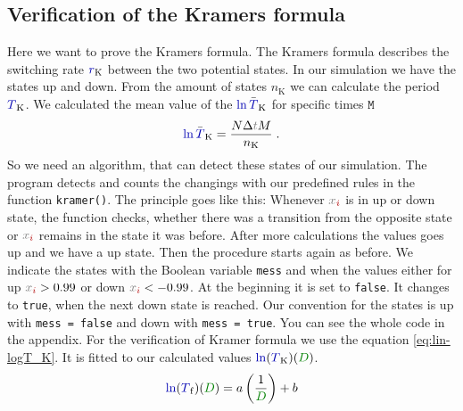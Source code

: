 \documentclass[10pt,fleqn,%
reqno,a4paper]{article}
\makeatletter
\def\mathcolor#1#{\@mathcolor{#1}}
\def\@mathcolor#1#2#3{%
        \protect\leavevmode
        \begingroup\color#1{#2}#3\endgroup
}
\newcommand{\nx}{\mathcolor{gray}{x}}
\newcommand{\nnx}{\mathcolor{green!50!black}{x}}
\newcommand{\nt}{\mathcolor{gray}{t}}
\newcommand{\nni}{\mathcolor{red!70!black}{i}}
\newcommand{\nr}{\mathcolor{blue!70!black}{r}}
\newcommand{\nT}{\mathcolor{blue!70!black}{T}}
\newcommand{\nln}{\mathcolor{blue!70!black}{\ln}}
\newcommand{\nD}{\mathcolor{green!50!black}{D}}
\makeatother
\begin{document}
\subsection{Verification of the Kramers formula}\label{sec:kramer}
Here we want to prove the Kramers formula. The Kramers formula describes the switching rate $ \nr_{\mathrm{K}} $ between the two potential states. 
In our simulation we have the states up and down. 
From the amount of states $ n_{\mathrm{K}} $ we can calculate the period $ \nT_{\mathrm{K}} $. We calculated the mean value of the $  \nln \bar{\nT}_{\mathrm{K}} $ for specific times $ \texttt{M} $
\begin{align*}
	\nln \bar{\nT}_{\mathrm{K}} = \frac{N\Delta \nt M}{n_{\mathrm{K}}} \; .
\end{align*}
 So we need an algorithm, that can detect these states of our simulation. 
The program detects and counts the changings with our predefined rules in the function \texttt{kramer()}.
The principle goes like this: Whenever $ \nx_{\nni} $ is in up or down state, the function checks, whether there was a transition from the opposite state or $ \nx_{\nni} $ remains in the state it was before. After more calculations the values goes up and we have a up state. 
Then the procedure starts again as before. We indicate the states with the Boolean variable \texttt{mess} and when the values either for up $ \nx_{\nni} > 0.99 $ or down $ \nx_{\nni}  < -0.99 $. At the beginning it  is set to \texttt{false}. It changes to \texttt{true}, when the next down state is reached. Our convention for the states is up with \texttt{mess = false} and down with \texttt{mess = true}. You can see the whole code in the appendix. For the verification of Kramer formula we use the equation \eqref{eq:lin-logT_K}. It is fitted to our calculated values $ \nln (\nT_{\mathrm{K}})(\nD) $. 
\begin{align*}
	\nln (\nT_{\mathrm{f}})(\nD)= a\left( \frac{1}{\nD} \right) + b
\end{align*}
 
\end{document}
